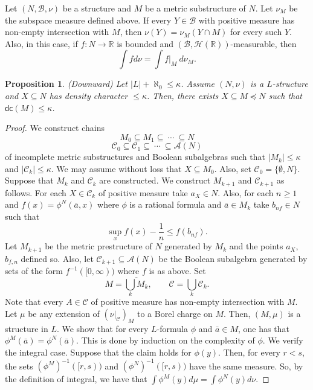 \documentclass[12pt]{article}
\newtheorem{proposition}[theorem]{Proposition}
\def\a{\bar {a}}\def\b{\bar {b}}\def\c{\bar {c}}
\def\Rn{\mathbb R}
\begin{document}
Let $(N,\mathcal B,\nu)$ be a structure and $M$ be a metric substructure of $N$.
Let $\nu_M$ be the subspace measure defined above.
If every $Y\in\mathcal B$ with positive measure has non-empty intersection with $M$,
then $\nu(Y)=\nu_M(Y\cap M)$ for every such $Y$.
Also, in this case, if $f:N\rightarrow\Rn$ is bounded and $(\mathcal B,\mathcal H(\Rn))$-measurable,
then $$\int fd\nu=\int f|_M\ d\nu_M.$$

\begin{proposition}\label{downward2} \emph{(Downward)}
Let $|L|+\aleph_0\leqslant\kappa$. Assume $(N,\nu)$ is a $L$-structure and $X\subseteq N$
has density character $\leqslant\kappa$.
Then, there exists $X\subseteq M\preccurlyeq N$ such that $\mathsf{dc}(M)\leqslant\kappa$.
\end{proposition}
\begin{proof}
We construct chains $$M_0\subseteq M_1\subseteq\ \cdots\ \subseteq N$$
$$\mathcal{C}_0\subseteq\mathcal{C}_1\subseteq\ \cdots\ \subseteq\mathcal{A}(N)$$
of incomplete metric substructures and Boolean subalgebras such that $|M_k|\leqslant\kappa$ and $|\mathcal{C}_k|\leqslant\kappa$.
We may assume without loss that $X\subseteq M_0$.
Also, set $\mathcal{C}_0=\{\emptyset,N\}$. Suppose that $M_k$ and $\mathcal{C}_k$ are constructed.
We construct $M_{k+1}$ and $\mathcal{C}_{k+1}$ as follows.
For each $X\in\mathcal{C}_k$ of positive measure take $a_X\in N$. Also, for each
$n\geqslant1$ and $f(x)=\phi^N(\a,x)$ where $\phi$ is a rational formula and $\a\in M_k$
take $b_{nf}\in N$ such that $$\sup_x f(x)-\frac{1}{n}\leqslant f(b_{nf}).$$
Let $M_{k+1}$ be the metric prestructure of $N$ generated by $M_k$ and the points $a_X$, $b_{f,n}$ defined so.
Also, let $\mathcal{C}_{k+1}\subseteq\mathcal{A}(N)$ be the Boolean subalgebra
generated by sets of the form $f^{-1}([0,\infty))$ where $f$ is as above.
Set $$M=\overline{\bigcup_k M_k},\ \ \ \ \ \ \ \ \ \mathcal{C}=\bigcup_k\mathcal{C}_k.$$
Note that every $A\in\mathcal{C}$ of positive measure has non-empty intersection with $M$.
Let $\mu$ be any extension of $(\nu|_{\mathcal C})_M$ to a Borel charge on $M$.
Then, $(M,\mu)$ is a structure in $L$. We show that for every $L$-formula $\phi$ and $\a\in M$,
one has that $\phi^M(\a)=\phi^N(\a)$. This is done by induction on the complexity of $\phi$.
We verify the integral case. Suppose that the claim holds for $\phi(y)$.
Then, for every $r<s$, the sets $(\phi^M)^{-1}([r,s))$ and $(\phi^N)^{-1}([r,s))$
have the same measure. So, by the definition of integral, we have that $\int\phi^M(y)d\mu=\int\phi^N(y)d\nu$.
\end{proof}
\end{document}
